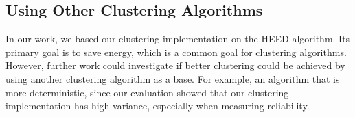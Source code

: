 \subsection{Using Other Clustering Algorithms}
In our work, we based our clustering implementation on the HEED algorithm. Its primary goal is to save energy, which is a common goal for clustering algorithms. However, further work could investigate if better clustering could be achieved by using another clustering algorithm as a base. For example, an algorithm that is more deterministic, since our evaluation showed that our clustering implementation has high variance, especially when measuring reliability.
